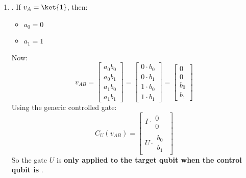 \begin{enumerate}
    \item {}. If $v_{A} = \ket{1}$, then:
    \begin{itemize}
        \item $a_{0} = 0$
        \item $a_{1} = 1$
    \end{itemize}
    Now:
    \begin{equation*}
        v_{AB} = \begin{bmatrix}
            a_0 b_0 \\
            a_0 b_1 \\
            a_1 b_0 \\
            a_1 b_1
        \end{bmatrix}
        =
        \begin{bmatrix}
            0 \cdot b_0 \\
            0 \cdot b_1 \\
            1 \cdot b_0 \\
            1 \cdot b_1
        \end{bmatrix}
        =
        \begin{bmatrix}
              0 \\
              0 \\
            b_0 \\
            b_1
        \end{bmatrix}
    \end{equation*}
    Using the generic controlled gate:
    \begin{equation*}
        C_{U}\left(v_{AB}\right) =
        \begin{bmatrix}
            I \cdot \begin{matrix} 0 \\ 0 \end{matrix} \\
            U \cdot \begin{matrix} b_{0} \\ b_{1} \end{matrix}
        \end{bmatrix}
    \end{equation*}
    So the gate $U$ is \textbf{only applied to the target qubit when the control qubit is} .
\end{enumerate}
